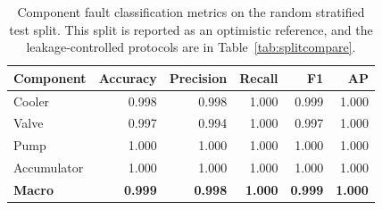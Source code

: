 \begin{table}[t]
\centering
\caption{Component fault classification metrics on the random stratified test split. This split is reported as an optimistic reference, and the leakage-controlled protocols are in Table~\ref{tab:splitcompare}.}
\label{tab:componentmetrics}
\footnotesize
\begin{tabular}{lrrrrr}
\toprule
Component & Accuracy & Precision & Recall & F1 & AP \\
\midrule
Cooler & 0.998 & 0.998 & 1.000 & 0.999 & 1.000 \\
Valve & 0.997 & 0.994 & 1.000 & 0.997 & 1.000 \\
Pump & 1.000 & 1.000 & 1.000 & 1.000 & 1.000 \\
Accumulator & 1.000 & 1.000 & 1.000 & 1.000 & 1.000 \\
\midrule
\textbf{Macro} & \textbf{0.999} & \textbf{0.998} & \textbf{1.000} & \textbf{0.999} & \textbf{1.000} \\
\bottomrule
\end{tabular}
\end{table}
